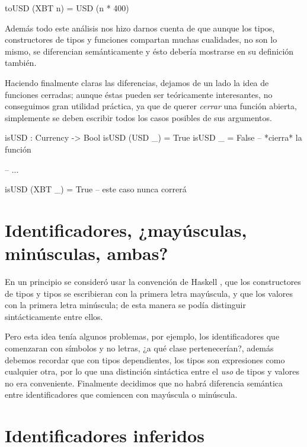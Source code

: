 {\begin{designfr}
\begin{anglercode}
toUSD (XBT n) = USD (n * 400)
\end{anglercode}

Además todo este análisis nos hizo darnos cuenta de que aunque los tipos, constructores de tipos y funciones compartan muchas cualidades, no son lo mismo, se diferencian semánticamente y ésto debería mostrarse en su definición también.

Haciendo finalmente claras las diferencias, dejamos de un lado la idea de funciones cerradas; aunque éstas pueden ser teóricamente interesantes, no conseguimos gran utilidad práctica, ya que de querer \textit{cerrar} una función abierta, simplemente se deben escribir todos los casos posibles de sus argumentos.

\begin{anglercode}
isUSD : Currency -> Bool
isUSD (USD _) = True
isUSD _ = False         -- *cierra* la función

-- ...

isUSD (XBT _) = True    -- este caso nunca correrá
\end{anglercode}
\end{designfr}

\section{Identificadores, ¿mayúsculas, minúsculas, ambas?}

\begin{designfr}
En un principio se consideró usar la convención de Haskell \cite{haskell}, que los constructores de tipos y tipos se escribieran con la primera letra mayúscula, y que los valores con la primera letra minúscula; de esta manera se podía distinguir sintácticamente entre ellos.

Pero esta idea tenía algunos problemas, por ejemplo, los identificadores que comenzaran con símbolos y no letras, ¿a qué clase pertenecerían?, además debemos recordar que con tipos dependientes, los tipos son expresiones como cualquier otra, por lo que una distinción sintáctica entre el \emph{uso} de tipos y valores no era conveniente. Finalmente decidimos que no habrá diferencia semántica entre identificadores que comiencen con mayúscula o minúscula.
\end{designfr}

\section{Identificadores inferidos}

}
